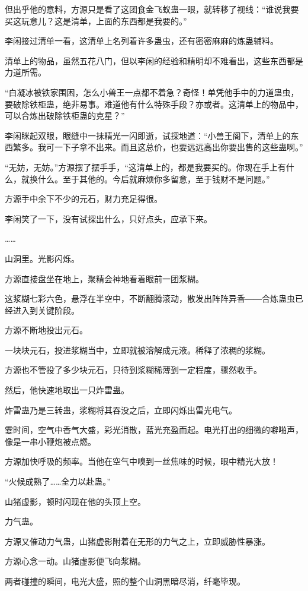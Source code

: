 \begin{this_body}
但出乎他的意料，方源只是看了这团食金飞蚁蛊一眼，就转移了视线：“谁说我要买这玩意儿？这是清单，上面的东西都是我要的。”

李闲接过清单一看，这清单上名列着许多蛊虫，还有密密麻麻的炼蛊辅料。

清单上的物品，虽然五花八门，但以李闲的经验和精明却不难看出，这些东西都是力道所需。

“白凝冰被铁家围困，怎么小兽王一点都不着急？奇怪！单凭他手中的力道蛊虫，要破除铁柜蛊，绝非易事。难道他有什么特殊手段？亦或者。这清单上的物品中，可以合炼出破除铁柜蛊的克星？”

李闲眯起双眼，眼缝中一抹精光一闪即逝，试探地道：“小兽王阁下，清单上的东西繁多。我可一下子拿不出来。而且这总价，也要远远高出你要出售的这些蛊啊。”

“无妨，无妨。”方源摆了摆手手，“这清单上的，都是我要买的。你现在手上有什么，就换什么。至于其他的。今后就麻烦你多留意，至于钱财不是问题。”

方源手中余下不少的元石，财力充足得很。

李闲笑了一下，没有试探出什么，只好点头，应承下来。

……

山洞里。光影闪烁。

方源直接盘坐在地上，聚精会神地看着眼前一团浆糊。

这浆糊七彩六色，悬浮在半空中，不断翻腾滚动，散发出阵阵异香――合炼蛊虫已经进入到关键阶段。

方源不断地投出元石。

一块块元石，投进浆糊当中，立即就被溶解成元液。稀释了浓稠的浆糊。

方源也不管投了多少块元石，只待到浆糊稀薄到一定程度，骤然收手。

然后，他快速地取出一只炸雷蛊。

炸雷蛊乃是三转蛊，浆糊将其吞没之后，立即闪烁出雷光电气。

霎时间，空气中香气大盛，彩光消散，蓝光充盈而起。电光打出的细微的噼啪声，像是一串小鞭炮被点燃。

方源加快呼吸的频率。当他在空气中嗅到一丝焦味的时候，眼中精光大放！

“火候成熟了……全力以赴蛊。”

山猪虚影，顿时闪现在他的头顶上空。

力气蛊。

方源又催动力气蛊，山猪虚影附着在无形的力气之上，立即威胁性暴涨。

方源心念一动。山猪虚影便飞向浆糊。

两者碰撞的瞬间，电光大盛，照的整个山洞黑暗尽消，纤毫毕现。


\end{this_body}
